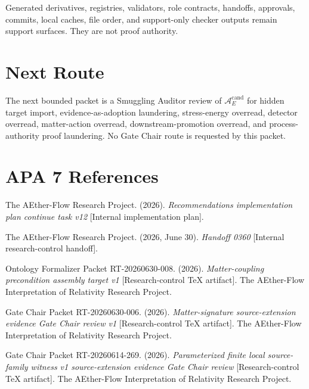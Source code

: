 \documentclass[11pt]{article}
\begin{document}
Generated derivatives, registries, validators, role contracts, handoffs,
approvals, commits, local caches, file order, and support-only checker outputs
remain support surfaces. They are not proof authority.

\section{Next Route}

The next bounded packet is a Smuggling Auditor review of
\(\mathcal{A}^{\mathrm{cand}}_E\) for hidden target import,
evidence-as-adoption laundering, stress-energy overread, detector overread,
matter-action overread, downstream-promotion overread, and process-authority
proof laundering. No Gate Chair route is requested by this packet.

\section{APA 7 References}

The AEther-Flow Research Project. (2026). \emph{Recommendations
implementation plan continue task v12} [Internal implementation plan].

The AEther-Flow Research Project. (2026, June 30). \emph{Handoff 0360}
[Internal research-control handoff].

Ontology Formalizer Packet RT-20260630-008. (2026).
\emph{Matter-coupling precondition assembly target v1}
[Research-control TeX artifact]. The AEther-Flow Interpretation of Relativity
Research Project.

Gate Chair Packet RT-20260630-006. (2026). \emph{Matter-signature
source-extension evidence Gate Chair review v1} [Research-control TeX
artifact]. The AEther-Flow Interpretation of Relativity Research Project.

Gate Chair Packet RT-20260614-269. (2026). \emph{Parameterized finite local
source-family witness v1 source-extension evidence Gate Chair review}
[Research-control TeX artifact]. The AEther-Flow Interpretation of Relativity
Research Project.
\end{document}

